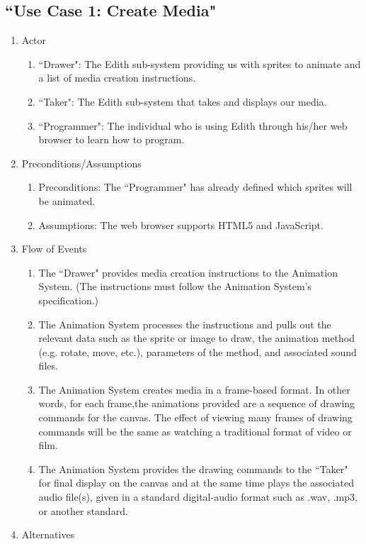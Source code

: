 \documentclass[12pt]{article}
\begin{document}
	\subsection{``Use Case 1: Create Media"}
\begin{enumerate}
  \item Actor
  \begin{enumerate}
  		\item ``Drawer": The Edith sub-system providing us with sprites to animate and a list of media creation instructions.
   		 \item ``Taker": The Edith sub-system that takes and displays our media.
       \item ``Programmer": The individual who is using Edith through his/her web browser to learn how to program.
  \end{enumerate}
  \item Preconditions/Assumptions
  \begin{enumerate}
   		 \item Preconditions: The ``Programmer" has already defined which sprites will be animated.
   		 \item Assumptions: The web browser supports HTML5 and JavaScript.
  \end{enumerate}
  \item Flow of Events
  \begin{enumerate}
   		 \item The ``Drawer" provides media creation instructions to the Animation System. (The instructions must follow the Animation System's specification.)
   		 \item The Animation System processes the instructions and pulls out the relevant data such as the sprite or image to draw, the animation method (e.g. rotate, move, etc.), parameters of the method, and associated sound files.
		\item The Animation System creates media in a frame-based format. In other words, for each frame,the animations provided are a sequence of drawing commands for the canvas. The effect of viewing many frames of drawing commands will be the same as watching a traditional format of video or film.
		\item The Animation System provides the drawing commands to the ``Taker" for final display on the canvas and at the same time plays the associated audio file(s), given in a standard digital-audio format such as .wav, .mp3, or another standard.
  \end{enumerate}
  \item Alternatives

\end{enumerate}
\end{document}
